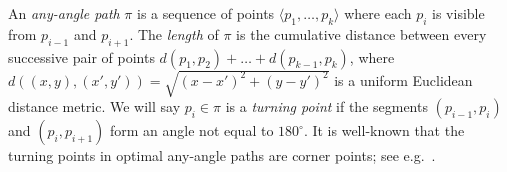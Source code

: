An \emph{any-angle path} $\pi$ is a sequence of points $\langle p_1,\dots,p_k
\rangle$ where each $p_{i}$ is visible from $p_{i-1}$ and $p_{i+1}$.  The
\emph{length} of $\pi$ is the cumulative distance between every successive
pair of points $d(p_1,p_2) + \dots + d(p_{k-1},p_k)$, where $d((x,y),
(x',y'))= \sqrt{(x-x')^2 + (y-y')^2}$ is a uniform Euclidean distance metric.
We will say $p_i \in \pi$ is a \emph{turning point} if the segments $(p_{i-1},
p_i)$ and $(p_i, p_{i+1})$ form an angle not equal to $180^{\circ}$.  It is
well-known that the turning points in optimal any-angle paths are corner
points; see e.g.~\cite{mitchell87}.

